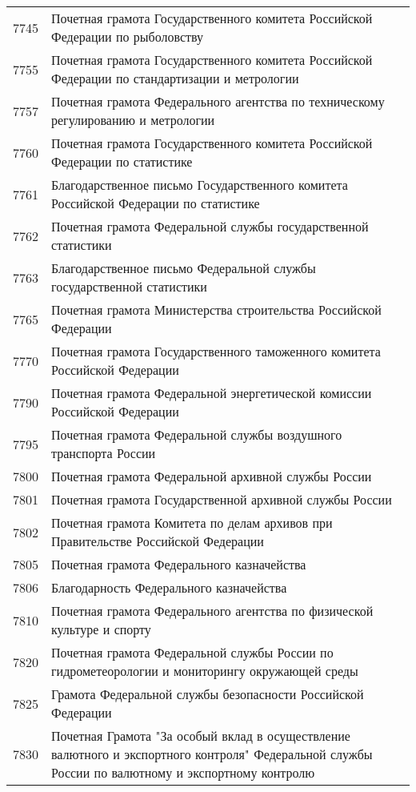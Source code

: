 \documentclass[10pt, a4paper, titlepage]{article}
\begin{document}
\begin{center}
\begin{longtable}{rp{}}
        7745 & Почетная грамота Государственного комитета Российской Федерации по рыболовству \\
        7755 & Почетная грамота Государственного комитета Российской Федерации по стандартизации и метрологии \\
        7757 & Почетная грамота Федерального агентства по техническому регулированию и метрологии \\
        7760 & Почетная грамота Государственного комитета Российской Федерации по статистике \\
        7761 & Благодарственное письмо Государственного комитета Российской Федерации по статистике \\
        7762 & Почетная грамота Федеральной службы государственной статистики \\
        7763 & Благодарственное письмо Федеральной службы государственной статистики \\
        7765 & Почетная грамота Министерства строительства Российской Федерации \\
        7770 & Почетная грамота Государственного таможенного комитета Российской Федерации \\
        7790 & Почетная грамота Федеральной энергетической комиссии Российской Федерации \\
        7795 & Почетная грамота Федеральной службы воздушного транспорта России \\
        7800 & Почетная грамота Федеральной архивной службы России \\
        7801 & Почетная грамота Государственной архивной службы России \\
        7802 & Почетная грамота Комитета по делам архивов при Правительстве Российской Федерации \\
        7805 & Почетная грамота Федерального казначейства \\
        7806 & Благодарность Федерального казначейства \\
        7810 & Почетная грамота Федерального агентства по физической культуре и спорту \\
        7820 & Почетная грамота Федеральной службы России по гидрометеорологии и мониторингу окружающей среды \\
        7825 & Грамота Федеральной службы безопасности Российской Федерации \\
        7830 & Почетная Грамота "За особый вклад в осуществление валютного и экспортного контроля" Федеральной службы России по валютному и экспортному контролю \\

\end{longtable}
\end{center}
\end{document}
